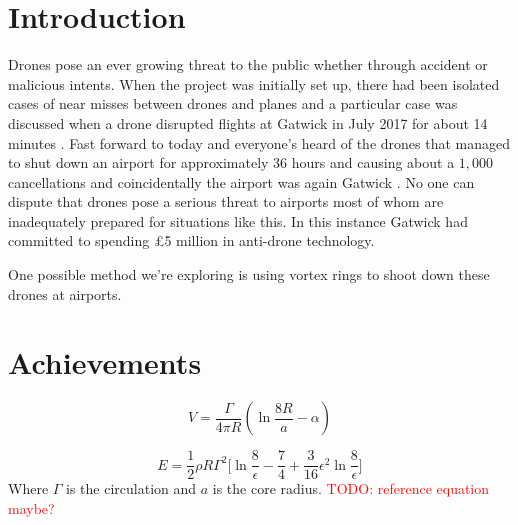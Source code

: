 \documentclass[a4paper,12pt]{article}
\begin{document}
\section{Introduction}
 Drones pose an ever growing threat to the public whether through accident or malicious intents. When the project was initially set up, there had been isolated cases of near misses between drones and planes and a particular case was discussed when a drone disrupted flights at Gatwick in July 2017 for about 14 minutes \cite{RefWorks:42}. Fast forward to today and everyone's heard of the drones that managed to shut down an airport for approximately $36$ hours and causing about a $1,000$ cancellations and coincidentally the airport was again Gatwick \cite{Gatwick}. No one can dispute that drones pose a serious threat to airports most of whom are inadequately prepared for situations like this. In this instance Gatwick had committed to spending £5 million in anti-drone technology.
\vspace{\baselineskip}

\noindent One possible method we're exploring is using vortex rings to shoot down these drones at airports.
\section{Achievements}
\begin{equation}
    V = \frac{\Gamma}{4\pi R} \left( \ln{\frac{8R}{a} - \alpha}\right)
\end{equation}

\vspace{\baselineskip}
\begin{equation}
    E = \frac{1}{2} \rho R \Gamma^{2}\bigg[\ln{\frac{8}{\epsilon}} - \frac{7}{4} + \frac{3}{16} \epsilon^{2} \ln{\frac{8}{\epsilon}} \bigg]
\end{equation}
Where $\Gamma$ is the circulation and $a$ is the core radius.\cite{dynamics_thin_vortexrings}
\textcolor{red}{TODO: reference equation maybe?}
\newpage


\end{document}
